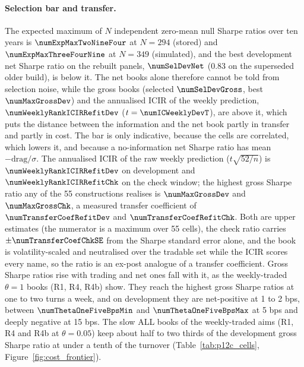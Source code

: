 \paragraph{Selection bar and transfer.}
The expected maximum of $N$ independent zero-mean null Sharpe ratios over ten years is $\numExpMaxTwoNineFour$ at $N=294$ (stored) and $\numExpMaxThreeFourNine$ at $N=349$ (simulated), and the best development net Sharpe ratio on the rebuilt panels, $\numSelDevNet$ (0.83 on the superseded older build), is below it. The net books alone therefore cannot be told from selection noise, while the gross books (selected $\numSelDevGross$, best $\numMaxGrossDev$) and the annualised ICIR of the weekly prediction, $\numWeeklyRankICIRRefitDev$ ($t=\numICWeeklyDevT$), are above it, which puts the distance between the information and the net book partly in transfer and partly in cost. The bar is only indicative, because the cells are correlated, which lowers it, and because a no-information net Sharpe ratio has mean $-\mathrm{drag}/\sigma$. The annualised ICIR of the raw weekly prediction ($t\sqrt{52/n}$) is $\numWeeklyRankICIRRefitDev$ on development and $\numWeeklyRankICIRRefitChk$ on the check window; the highest gross Sharpe ratio any of the 55 constructions realises is $\numMaxGrossDev$ and $\numMaxGrossChk$, a measured transfer coefficient of $\numTransferCoefRefitDev$ and $\numTransferCoefRefitChk$. Both are upper estimates (the numerator is a maximum over 55 cells), the check ratio carries $\pm\numTransferCoefChkSE$ from the Sharpe standard error alone, and the book is volatility-scaled and neutralised over the tradable set while the ICIR scores every name, so the ratio is an ex-post analogue of a transfer coefficient. Gross Sharpe ratios rise with trading and net ones fall with it, as the weekly-traded $\theta=1$ books (R1, R4, R4b) show. They reach the highest gross Sharpe ratios at one to two turns a week, and on development they are net-positive at 1 to 2 bps, between $\numThetaOneFiveBpsMin$ and $\numThetaOneFiveBpsMax$ at 5 bps and deeply negative at 15 bps. The slow ALL books of the weekly-traded aims (R1, R4 and R4b at $\theta=0.05$) keep about half to two thirds of the development gross Sharpe ratio at under a tenth of the turnover (Table~\ref{tab:p12c_cells}, Figure~\ref{fig:cost_frontier}).

